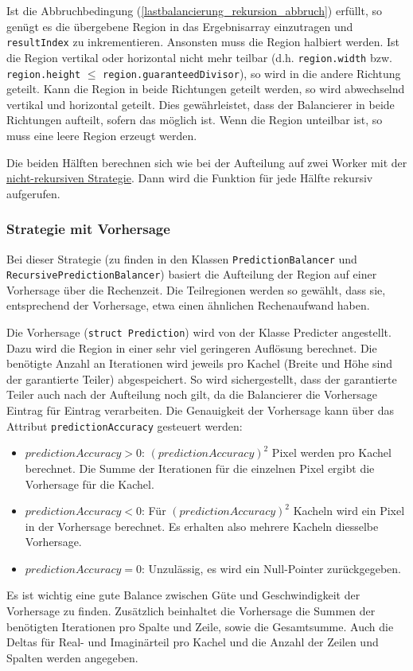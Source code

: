 Ist die Abbruchbedingung (\ref{lastbalancierung_rekursion_abbruch}) erfüllt, so genügt es die übergebene Region in das Ergebnisarray einzutragen und \verb|resultIndex| zu inkrementieren.
Ansonsten muss die Region halbiert werden. Ist die Region vertikal oder horizontal nicht mehr teilbar (d.h. \verb|region.width| bzw. \verb|region.height| $\leq$ \verb|region.guaranteedDivisor|), so wird in die andere Richtung geteilt.
Kann die Region in beide Richtungen geteilt werden, so wird abwechselnd vertikal und horizontal geteilt. Dies gewährleistet, dass der Balancierer in beide Richtungen aufteilt, sofern das möglich ist.
Wenn die Region unteilbar ist, so muss eine leere Region erzeugt werden.

Die beiden Hälften berechnen sich wie bei der Aufteilung auf zwei Worker mit der \hyperref[lastbalancierung_naiv]{nicht-rekursiven Strategie}.
Dann wird die Funktion für jede Hälfte rekursiv aufgerufen.

\subsubsection{Strategie mit Vorhersage}

Bei dieser Strategie (zu finden in den Klassen \verb|PredictionBalancer| und \\ \verb|RecursivePredictionBalancer|) basiert die Aufteilung der Region auf einer Vorhersage über die Rechenzeit.
Die Teilregionen werden so gewählt, dass sie, entsprechend der Vorhersage, etwa einen ähnlichen Rechenaufwand haben.

Die Vorhersage (\verb|struct Prediction|) wird von der Klasse Predicter angestellt.
Dazu wird die Region in einer sehr viel geringeren Auflösung berechnet.
Die benötigte Anzahl an Iterationen wird jeweils pro Kachel (Breite und Höhe sind der garantierte Teiler) abgespeichert.
So wird sichergestellt, dass der garantierte Teiler auch nach der Aufteilung noch gilt, da die Balancierer die Vorhersage Eintrag für Eintrag verarbeiten.
Die Genauigkeit der Vorhersage kann über das Attribut \verb|predictionAccuracy| gesteuert werden:
\begin{itemize}
	\item $predictionAccuracy > 0$: $(predictionAccuracy)^2$ Pixel werden pro Kachel berechnet. Die Summe der Iterationen für die einzelnen Pixel ergibt die Vorhersage für die Kachel.
	\item $predictionAccuracy < 0$: Für $(predictionAccuracy)^2$ Kacheln wird ein Pixel in der Vorhersage berechnet. Es erhalten also mehrere Kacheln diesselbe Vorhersage.
	\item $predictionAccuracy = 0$: Unzulässig, es wird ein Null-Pointer zurückgegeben.
\end{itemize}
Es ist wichtig eine gute Balance zwischen Güte und Geschwindigkeit der Vorhersage zu finden.
Zusätzlich beinhaltet die Vorhersage die Summen der benötigten Iterationen pro Spalte und Zeile, sowie die Gesamtsumme.
Auch die Deltas für Real- und Imaginärteil pro Kachel und die Anzahl der Zeilen und Spalten werden angegeben.

